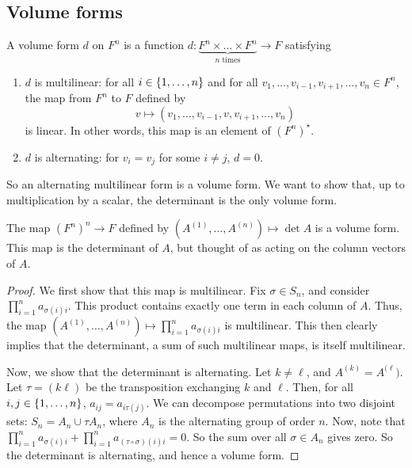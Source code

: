 \subsection{Volume forms}
\begin{definition}
	A volume form \( d \) on \( F^n \) is a function \( d \colon \underbrace{F^n \times \dots \times F^n}_{n \text{ times}} \to F \) satisfying
	\begin{enumerate}
		\item \( d \) is multilinear: for all \( i \in \qty{1, \dots, n} \) and for all \( v_1, \dots, v_{i-1}, v_{i+1}, \dots, v_n \in F^n \), the map from \( F^n \) to \( F \) defined by
		      \[
			      v \mapsto (v_1, \dots, v_{i-1}, v, v_{i+1}, \dots, v_n)
		      \]
		      is linear.
		      In other words, this map is an element of \( (F^n)^\star \).
		\item \( d \) is alternating: for \( v_i = v_j \) for some \( i \neq j \), \( d = 0 \).
	\end{enumerate}
	So an alternating multilinear form is a volume form.
	We want to show that, up to multiplication by a scalar, the determinant is the only volume form.
\end{definition}
\begin{lemma}
	The map \( (F^n)^n \to F \) defined by \( (A^{(1)}, \dots, A^{(n)}) \mapsto \det A \) is a volume form.
	This map is the determinant of \( A \), but thought of as acting on the column vectors of \( A \).
\end{lemma}
\begin{proof}
	We first show that this map is multilinear.
	Fix \( \sigma \in S_n \), and consider \( \prod_{i=1}^n a_{\sigma(i) i} \).
	This product contains exactly one term in each column of \( A \).
	Thus, the map \( (A^{(1)}, \dots, A^{(n)}) \mapsto \prod_{i=1}^n a_{\sigma(i) i} \) is multilinear.
	This then clearly implies that the determinant, a sum of such multilinear maps, is itself multilinear.

	Now, we show that the determinant is alternating.
	Let \( k \neq \ell \), and \( A^{(k)} = A^{(\ell}) \).
	Let \( \tau = ( k \ell ) \) be the transposition exchanging \( k \) and \( \ell \).
	Then, for all \( i, j \in \qty{1, \dots, n} \), \( a_{ij} = a_{i \tau(j)} \).
	We can decompose permutations into two disjoint sets: \( S_n = A_n \cup \tau A_n \), where \( A_n \) is the alternating group of order \( n \).
	Now, note that \( \prod_{i=1}^n a_{\sigma(i) i} + \prod_{i=1}^n a_{(\tau \circ \sigma)(i) i} = 0 \).
	So the sum over all \( \sigma \in A_n \) gives zero.
	So the determinant is alternating, and hence a volume form.
\end{proof}
